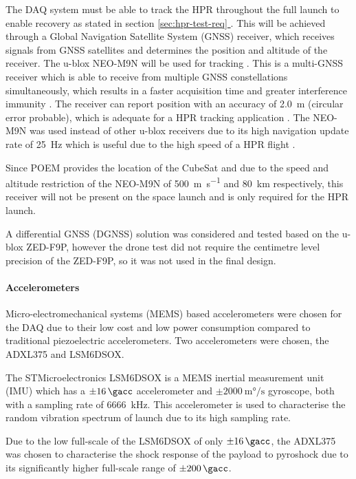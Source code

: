 \documentclass[a4paper,11pt]{article}
\newcommand*{\fullref}[1]{\hyperref[{#1}]{\ref*{#1} \nameref*{#1}}}
\begin{document}
The DAQ system must be able to track the HPR throughout the full launch to enable recovery as stated in section \fullref{sec:hpr-test-req}. This will be achieved through a Global Navigation Satellite System (GNSS) receiver, which receives signals from GNSS satellites and determines the position and altitude of the receiver. The u-blox NEO-M9N will be used for tracking \cite{ublox2023neo_m9n_datasheet}. This is a multi-GNSS receiver which is able to receive from multiple GNSS constellations simultaneously, which results in a faster acquisition time and greater interference immunity \cite{ublox2023neo_m9n_datasheet}. The receiver can report position with an accuracy of \SI{2.0}{\metre} (circular error probable), which is adequate for a HPR tracking application \cite{ublox2023neo_m9n_datasheet}. The NEO-M9N was used instead of other u-blox receivers due to its high navigation update rate of \SI{25}{\hertz} which is useful due to the high speed of a HPR flight \cite{ublox2023neo_m9n_datasheet}.

Since POEM provides the location of the CubeSat and due to the speed and altitude restriction of the NEO-M9N of \SI{500}{\metre\per\second} and \SI{80}{\kilo\metre} respectively, this receiver will not be present on the space launch and is only required for the HPR launch.

A differential GNSS (DGNSS) solution was considered and tested based on the u-blox ZED-F9P, however the drone test did not require the centimetre level precision of the ZED-F9P, so it was not used in the final design.

\paragraph{Accelerometers}

Micro-electromechanical systems (MEMS) based accelerometers were chosen for the DAQ due to their low cost and low power consumption compared to traditional piezoelectric accelerometers. %
Two accelerometers were chosen, the ADXL375 and LSM6DSOX.

The STMicroelectronics LSM6DSOX is a MEMS inertial measurement unit (IMU) which has a $\pm\SI{16}{\gacc}$ accelerometer and $\pm\SI{2000}{\milli\degree\per\second}$ gyroscope, both with a sampling rate of \SI{6666}{\kilo\hertz}. This accelerometer is used to characterise the random vibration spectrum of launch due to its high sampling rate.

Due to the low full-scale of the LSM6DSOX of only $\pm\SI{16}{\gacc}$, the ADXL375 was chosen to characterise the shock response of the payload to pyroshock due to its significantly higher full-scale range of $\pm\SI{200}{\gacc}$.
\end{document}
